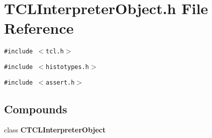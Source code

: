 \section{TCLInterpreter\-Object.h File Reference}
\label{TCLInterpreterObject_8h}
{\tt \#include $<$tcl.h$>$}\par
{\tt \#include $<$histotypes.h$>$}\par
{\tt \#include $<$assert.h$>$}\par
\subsection*{Compounds}
\begin{CompactItemize}
\item 
class {\bf CTCLInterpreter\-Object}
\end{CompactItemize}
